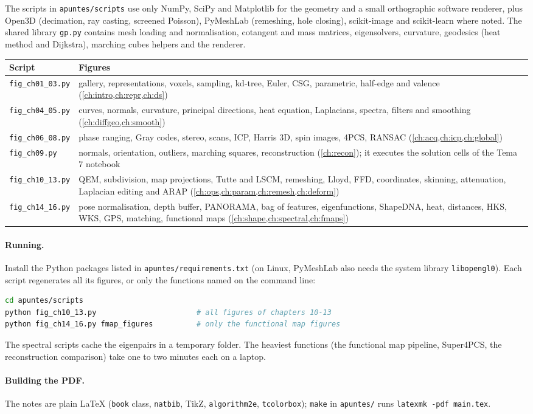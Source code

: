 The scripts in \texttt{apuntes/scripts} use only NumPy, SciPy and Matplotlib for the geometry
and a small orthographic software renderer, plus Open3D (decimation, ray casting, screened Poisson),
PyMeshLab (remeshing, hole closing), scikit-image and scikit-learn where noted. The shared library
\texttt{gp.py} contains mesh loading and normalisation, cotangent and mass matrices, eigensolvers,
curvature, geodesics (heat method and Dijkstra), marching cubes helpers and the renderer.

\begin{center}
\small
\begin{tabularx}{\textwidth}{@{}lX@{}}
\toprule
Script & Figures \\
\midrule
\texttt{fig\_ch01\_03.py} & gallery, representations, voxels, sampling, kd-tree, Euler, CSG, parametric,
half-edge and valence (\cref{ch:intro,ch:repr,ch:ds}) \\
\texttt{fig\_ch04\_05.py} & curves, normals, curvature, principal directions, heat equation, Laplacians,
spectra, filters and smoothing (\cref{ch:diffgeo,ch:smooth}) \\
\texttt{fig\_ch06\_08.py} & phase ranging, Gray codes, stereo, scans, ICP, Harris 3D, spin images, 4PCS,
RANSAC (\cref{ch:acq,ch:icp,ch:global}) \\
\texttt{fig\_ch09.py} & normals, orientation, outliers, marching squares, reconstruction
(\cref{ch:recon}); it executes the solution cells of the Tema 7 notebook \\
\texttt{fig\_ch10\_13.py} & QEM, subdivision, map projections, Tutte and LSCM, remeshing, Lloyd, FFD,
coordinates, skinning, attenuation, Laplacian editing and ARAP (\cref{ch:ops,ch:param,ch:remesh,ch:deform}) \\
\texttt{fig\_ch14\_16.py} & pose normalisation, depth buffer, PANORAMA, bag of features, eigenfunctions,
ShapeDNA, heat, distances, HKS, WKS, GPS, matching, functional maps (\cref{ch:shape,ch:spectral,ch:fmaps}) \\
\bottomrule
\end{tabularx}
\end{center}

\paragraph{Running.} Install the Python packages listed in \texttt{apuntes/requirements.txt} (on Linux,
PyMeshLab also needs the system library \texttt{libopengl0}). Each script regenerates all its figures,
or only the functions named on the command line:
\begin{lstlisting}[language=bash,numbers=none]
cd apuntes/scripts
python fig_ch10_13.py                       # all figures of chapters 10-13
python fig_ch14_16.py fmap_figures          # only the functional map figures
\end{lstlisting}
The spectral scripts cache the eigenpairs in a temporary folder. The heaviest functions (the
functional map pipeline, Super4PCS, the reconstruction comparison) take one to two minutes each on a
laptop.

\paragraph{Building the PDF.} The notes are plain \LaTeX{} (\texttt{book} class, \texttt{natbib},
TikZ, \texttt{algorithm2e}, \texttt{tcolorbox}); \texttt{make} in \texttt{apuntes/} runs
\texttt{latexmk -pdf main.tex}.
